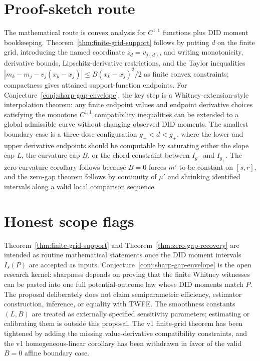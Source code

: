 \documentclass[11pt]{article}
\theoremstyle{definition}
\theoremstyle{plain}
\theoremstyle{remark}
\begin{document}
\section{Proof-sketch route}
The mathematical route is convex analysis for \(C^{1,1}\) functions plus DID moment bookkeeping.  Theorem~\ref{thm:finite-grid-support} follows by putting \(d\) on the finite grid, introducing the named coordinate \(z_d=v_{j(d)}\), and writing monotonicity, derivative bounds, Lipschitz-derivative restrictions, and the Taylor inequalities \(|m_k-m_j-v_j(x_k-x_j)|\le B(x_k-x_j)^2/2\) as finite convex constraints; compactness gives attained support-function endpoints.  For Conjecture~\ref{conj:sharp-gap-envelope}, the key step is a Whitney-extension-style interpolation theorem: any finite endpoint values and endpoint derivative choices satisfying the monotone \(C^{1,1}\) compatibility inequalities can be extended to a global admissible curve without changing observed DID moments.  The smallest boundary case is a three-dose configuration \(g_-<d<g_+\), where the lower and upper derivative endpoints should be computable by saturating either the slope cap \(L\), the curvature cap \(B\), or the chord constraint between \(I_{g_-}\) and \(I_{g_+}\).  The zero-curvature corollary follows because \(B=0\) forces \(m'\) to be constant on \([s,r]\), and the zero-gap theorem follows by continuity of \(\mu'\) and shrinking identified intervals along a valid local comparison sequence.

\section{Honest scope flags}
Theorem~\ref{thm:finite-grid-support} and Theorem~\ref{thm:zero-gap-recovery} are intended as routine mathematical statements once the DID moment intervals \(I_s(P)\) are accepted as inputs.  Conjecture~\ref{conj:sharp-gap-envelope} is the open research kernel: sharpness depends on proving that the finite Whitney witnesses can be pasted into one full potential-outcome law whose DID moments match \(P\).  The proposal deliberately does not claim semiparametric efficiency, estimator construction, inference, or equality with TWFE.  The smoothness constants \((L,B)\) are treated as externally specified sensitivity parameters; estimating or calibrating them is outside this proposal.  The v1 finite-grid theorem has been tightened by adding the missing value-derivative compatibility constraints, and the v1 homogeneous-linear corollary has been withdrawn in favor of the valid \(B=0\) affine boundary case.
\end{document}

